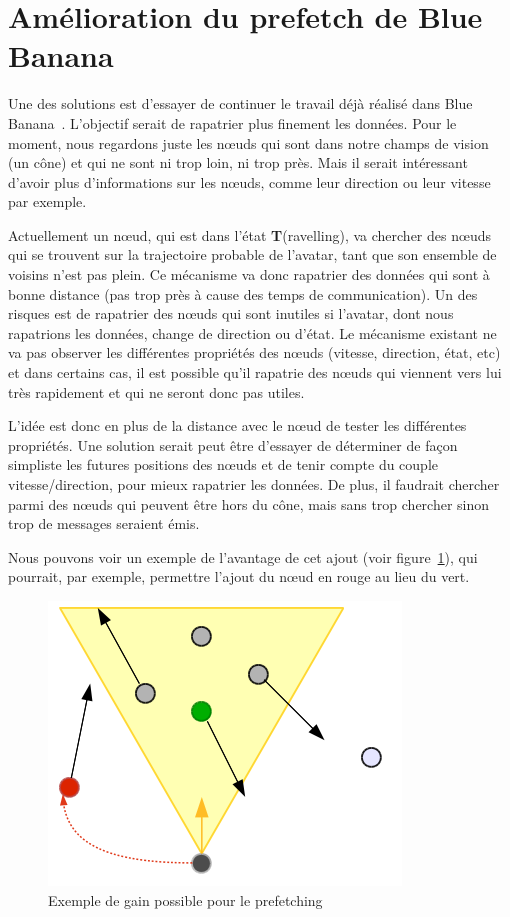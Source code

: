 \documentclass[11pt,a4paper]{article}
\begin{document}
\newpage
\section{Amélioration du prefetch de Blue Banana}
Une des solutions est d'essayer de continuer le travail déjà réalisé dans Blue Banana~\cite{191}. L'objectif serait de rapatrier plus finement les données. Pour le moment, nous regardons juste les nœuds qui sont dans notre champs de vision (un cône) et qui ne sont ni trop loin, ni trop près. Mais il serait intéressant d'avoir plus d'informations sur les nœuds, comme leur direction ou leur vitesse par exemple. 
\par Actuellement un nœud, qui est dans l'état \textbf{T}(ravelling), va chercher des nœuds qui se trouvent sur la trajectoire probable de l'avatar, tant que son ensemble de voisins n'est pas plein. Ce mécanisme va donc rapatrier des données qui sont à bonne distance (pas trop près à cause des temps de communication). Un des risques est de rapatrier des nœuds qui sont inutiles si l'avatar, dont nous rapatrions les données, change de direction ou d'état. Le mécanisme existant ne va pas observer les différentes propriétés des nœuds (vitesse, direction, état, etc) et dans certains cas, il est possible qu'il rapatrie des nœuds qui viennent vers lui très rapidement et qui ne seront donc pas utiles.
\par L'idée est donc en plus de la distance avec le nœud de tester les différentes propriétés. Une solution serait peut être d'essayer de déterminer de façon simpliste les futures positions des nœuds et de tenir compte du couple vitesse/direction, pour mieux rapatrier les données. De plus, il faudrait chercher parmi des nœuds qui peuvent être hors du cône, mais sans trop chercher sinon trop de messages seraient émis.
\par  Nous pouvons voir un exemple de l'avantage de cet ajout (voir figure~\ref{prefetchav}), qui pourrait, par exemple, permettre l'ajout du nœud en rouge au lieu du vert.

	\begin{figure}[!h]
        \centering
        \includegraphics[scale=0.45]{./images/prefetchav.png}
        \caption{Exemple de gain possible pour le prefetching}
        \label{prefetchav}
        \end{figure}
\end{document}
